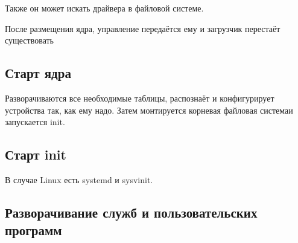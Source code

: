 Также он может искать драйвера в файловой системе.

После размещения ядра, управление передаётся ему и загрузчик перестаёт существовать

\subsection{Старт ядра}

Разворачиваются все необходимые таблицы, распознаёт и конфигурирует устройства так, как ему надо. Затем монтируется корневая файловая системаи запускается init.

\subsection{Старт init}

В случае Linux есть systemd и sysvinit. 

\subsection{Разворачивание служб и пользовательских программ}
